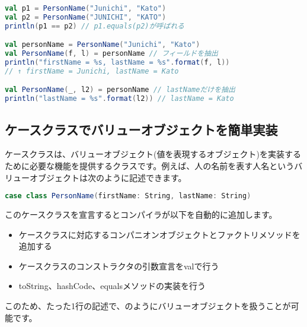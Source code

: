 \begin{lstlisting}[language=scala, label=src:case_class, caption=ケースクラスで定義したバリューオブジェクトの利用]
val p1 = PersonName("Junichi", "Kato")
val p2 = PersonName("JUNICHI", "KATO")
println(p1 == p2) // p1.equals(p2)が呼ばれる

val personName = PersonName("Junichi", "Kato")
val PersonName(f, l) = personName // フィールドを抽出
println("firstName = %s, lastName = %s".format(f, l))
// ↑ firstName = Junichi, lastName = Kato

val PersonName(_, l2) = personName // lastNameだけを抽出
println("lastName = %s".format(l2)) // lastName = Kato 
\end{lstlisting}

\subsection{ケースクラスでバリューオブジェクトを簡単実装}
ケースクラスは、バリューオブジェクト(値を表現するオブジェクト)を実装するために必要な機能を提供するクラスです。例えば、人の名前を表す人名というバリューオブジェクトは次のように記述できます。
\begin{lstlisting}[language=scala, frame=none]
case class PersonName(firstName: String, lastName: String)
\end{lstlisting}
このケースクラスを宣言するとコンパイラが以下を自動的に追加します。

\begin{itemize}
\item ケースクラスに対応するコンパニオンオブジェクトとファクトリメソッドを追加する
\item ケースクラスのコンストラクタの引数宣言をvalで行う
\item toString、hashCode、equalsメソッドの実装を行う
\end{itemize}
 
このため、たった1行の記述で、のようにバリューオブジェクトを扱うことが可能です。 

